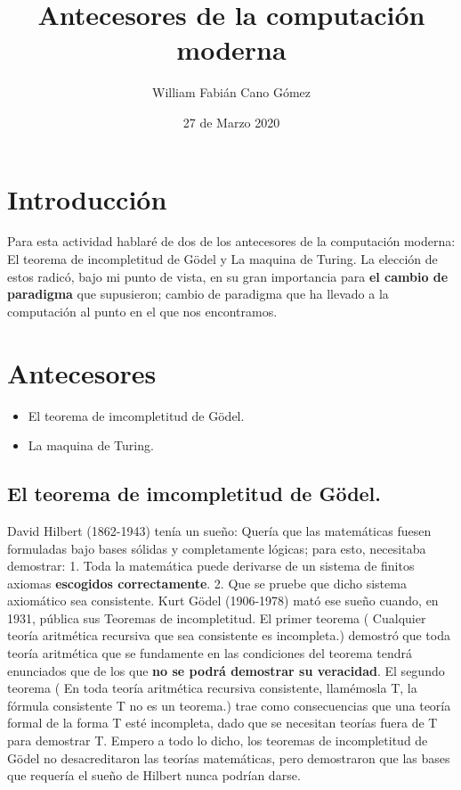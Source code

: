 \documentclass[conference,compsoc]{IEEEtran}
\title{Antecesores de la computación moderna}
\author{William Fabián Cano Gómez}
\date{27 de Marzo 2020}
\begin{document}
\maketitle
\tableofcontents
\section{Introducción}

Para esta actividad hablaré de dos de los antecesores de la computación moderna: El teorema de incompletitud de Gödel y La maquina de Turing.
\newline 
La elección de estos radicó, bajo mi punto de vista, en su gran importancia para \textbf{el cambio de paradigma} que supusieron; cambio de paradigma que ha llevado a la computación al punto en el que nos encontramos.

\section{Antecesores}
\begin{itemize}
  \item El teorema de imcompletitud de Gödel.
  \item La maquina de Turing.
\end{itemize}

\subsection {El teorema de imcompletitud de Gödel.}
David Hilbert (1862-1943) tenía un sueño: Quería que las matemáticas fuesen formuladas bajo bases sólidas y completamente lógicas; para esto, necesitaba demostrar: 1. Toda la matemática puede derivarse de un sistema de finitos axiomas \textbf{escogidos correctamente}. 2. Que se pruebe que dicho sistema axiomático sea consistente.
\newline
Kurt Gödel (1906-1978) mató ese sueño cuando, en 1931, pública sus Teoremas de incompletitud.
\newline
El primer teorema ( Cualquier teoría aritmética recursiva que sea consistente es incompleta.) demostró que toda teoría aritmética que se fundamente en las condiciones del teorema tendrá enunciados que de los que \textbf{no se podrá demostrar su veracidad}.
\newline
El segundo teorema ( En toda teoría aritmética recursiva consistente, llamémosla T, la fórmula consistente T no es un teorema.) trae como consecuencias que una teoría formal de la forma T esté incompleta, dado que se necesitan teorías fuera de T para demostrar T.
\newline
Empero a todo lo dicho, los teoremas de incompletitud de Gödel no desacreditaron las teorías matemáticas, pero demostraron que las bases que requería el sueño de Hilbert nunca podrían darse.
\end{document}
